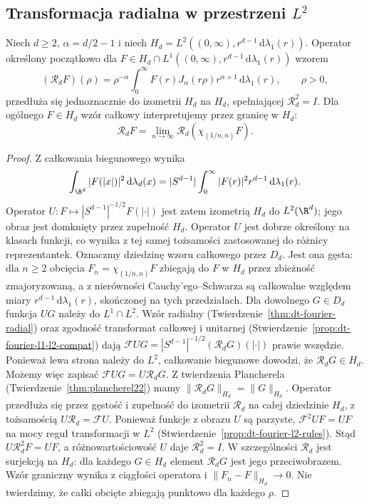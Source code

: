 \subsection{Transformacja radialna w przestrzeni \texorpdfstring{$L^2$}{L2}}

\begin{twierdzenie}
\label{thm:dt-radial-plancherel}
Niech $d\ge2$, $\alpha=d/2-1$ i niech
$H_d=L^2((0,\infty),r^{d-1}\,\mathrm d\lambda_1(r))$.
Operator określony początkowo dla
$F\in H_d\cap L^1((0,\infty),r^{d-1}\,\mathrm d\lambda_1(r))$
wzorem
\[
 (\mathcal R_dF)(\rho)=\rho^{-\alpha}
 \int_0^\infty F(r)J_\alpha(r\rho)r^{\alpha+1}
 \,\mathrm d\lambda_1(r),\qquad \rho>0,
\]
przedłuża się jednoznacznie do izometrii $H_d$ na $H_d$,
spełniającej $\mathcal R_d^2=I$. Dla ogólnego $F\in H_d$
wzór całkowy interpretujemy przez granicę w $H_d$:
\[
 \mathcal R_dF=\lim_{n\to\infty}\mathcal R_d
 (\chi_{(1/n,n)}F).
\]
\end{twierdzenie}
\begin{proof}
Z całkowania biegunowego wynika
\[
 \int_{\R^d}|F(|x|)|^2\,\mathrm d\lambda_d(x)
 = |S^{d-1}|\int_0^\infty |F(r)|^2r^{d-1}
 \,\mathrm d\lambda_1(r).
\]
Operator $U:F\mapsto |S^{d-1}|^{-1/2}F(|\cdot|)$
jest zatem izometrią $H_d$ do $L^2(\R^d)$; jego obraz
jest domknięty przez zupełność $H_d$.
Operator $U$ jest dobrze określony na klasach funkcji,
co wynika z tej samej tożsamości zastosowanej do
różnicy reprezentantek. Oznaczmy dziedzinę wzoru
całkowego przez $D_d$. Jest ona gęsta:
dla $n\ge2$ obcięcia $F_n=\chi_{(1/n,n)}F$
zbiegają do $F$ w $H_d$
przez zbieżność zmajoryzowaną, a z nierówności
Cauchy'ego--Schwarza są całkowalne względem miary
$r^{d-1}\,\mathrm d\lambda_1(r)$, skończonej na tych
przedziałach.
Dla dowolnego $G\in D_d$ funkcja $UG$ należy do
$L^1\cap L^2$. Wzór radialny
(Twierdzenie~\ref{thm:dt-fourier-radial}) oraz zgodność
transformat całkowej i unitarnej
(Stwierdzenie~\ref{prop:dt-fourier-l1-l2-compat})
dają $\mathcal FUG=|S^{d-1}|^{-1/2}(\mathcal R_dG)(|\cdot|)$
prawie wszędzie. Ponieważ lewa strona należy do $L^2$,
całkowanie biegunowe dowodzi, że $\mathcal R_dG\in H_d$.
Możemy więc zapisać $\mathcal FUG=U\mathcal R_dG$.
Z twierdzenia Plancherela
(Twierdzenie~\ref{thm:plancherel22})
mamy $\|\mathcal R_dG\|_{H_d}=\|G\|_{H_d}$.
Operator przedłuża się przez gęstość i zupełność
do izometrii $\mathcal R_d$ na całej dziedzinie $H_d$,
z tożsamością $U\mathcal R_d=\mathcal FU$.
Ponieważ funkcje z obrazu $U$ są parzyste,
$\mathcal F^2 UF=UF$ na mocy reguł transformacji w $L^2$
(Stwierdzenie~\ref{prop:dt-fourier-l2-rules}).
Stąd $U\mathcal R_d^2F=UF$, a różnowartościowość $U$
daje $\mathcal R_d^2=I$. W szczególności $\mathcal R_d$
jest surjekcją na $H_d$: dla każdego $G\in H_d$
element $\mathcal R_dG$ jest jego przeciwobrazem.
Wzór graniczny wynika z ciągłości operatora i
$\|F_n-F\|_{H_d}\to0$. Nie twierdzimy, że całki
obcięte zbiegają punktowo dla każdego $\rho$.
\end{proof}



